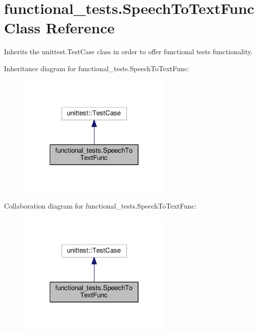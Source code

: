 \hypertarget{classfunctional__tests_1_1SpeechToTextFunc}{\section{functional\-\_\-tests.\-Speech\-To\-Text\-Func Class Reference}
\label{classfunctional__tests_1_1SpeechToTextFunc}
}


Inherits the unittest.\-Test\-Case class in order to offer functional tests functionality.  




Inheritance diagram for functional\-\_\-tests.\-Speech\-To\-Text\-Func\-:
\nopagebreak
\begin{figure}[H]
\begin{center}
\leavevmode
\includegraphics[width=212pt]{classfunctional__tests_1_1SpeechToTextFunc__inherit__graph}
\end{center}
\end{figure}


Collaboration diagram for functional\-\_\-tests.\-Speech\-To\-Text\-Func\-:
\nopagebreak
\begin{figure}[H]
\begin{center}
\leavevmode
\includegraphics[width=212pt]{classfunctional__tests_1_1SpeechToTextFunc__coll__graph}
\end{center}
\end{figure}
